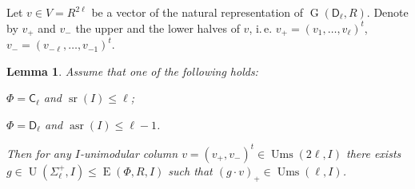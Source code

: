\documentclass[11pt]{amsart}
\theoremstyle{plain}
\numberwithin{equation}{section}
\newtheorem{lemma}{Lemma}
\numberwithin{lemma}{section}
\theoremstyle{definition}
\theoremstyle{remark}
\DeclareMathOperator{\G}{G}
\DeclareMathOperator{\E}{E}
\DeclareMathOperator{\U}{U}
\DeclareMathOperator{\sr}{sr}
\DeclareMathOperator{\asr}{asr}
\DeclareMathOperator{\Ums}{Ums}
\newcommand{\rC}{\mathsf{C}}
\newcommand{\rD}{\mathsf{D}}
\begin{document}
Let $v\in V=R^{2\ell}$ be a vector of the natural representation of $\G(\rD_\ell, R)$.
Denote by $v_+$ and $v_-$ the upper and the lower halves of $v$, i.\,e. $v_+=(v_1, \ldots, v_\ell)^t$, $v_-=(v_{-\ell}, \ldots, v_{-1})^t$.
\begin{lemma}\label{lemma:asrUnip}
Assume that one of the following holds:
\begin{lemlist}
\item \label{item:asrUnipC} $\Phi=\rC_\ell$ and $\sr(I) \leqslant \ell$;
\item \label{item:asrUnipD} $\Phi=\rD_\ell$ and $\asr(I)\leqslant \ell -1$.
\end{lemlist}
Then for any $I$-unimodular column $v=(v_+, v_-)^t\in\Ums(2\ell, I)$ there exists $g\in\U(\Sigma^+_\ell, I) \leq \E(\Phi, R, I)$ 
such that $(g \cdot v)_+ \in \Ums(\ell, I)$.
\end{lemma}
\end{document}
